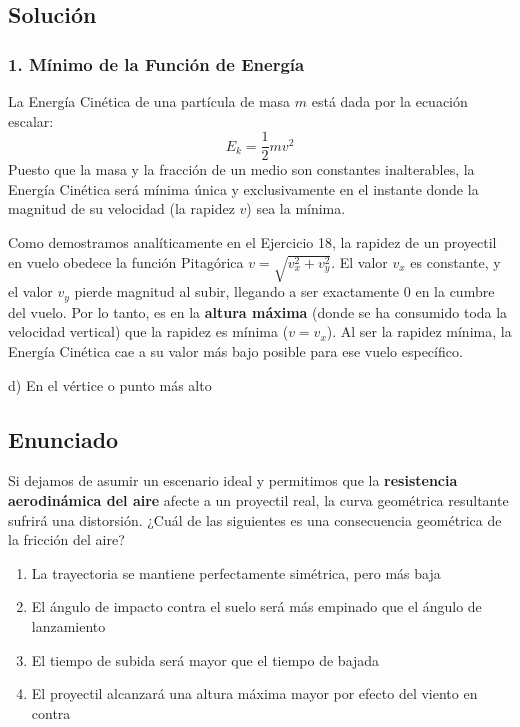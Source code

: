 \documentclass[12pt, a4paper]{article}
\begin{document}
\subsection*{Solución}

\subsubsection*{1. Mínimo de la Función de Energía}
La Energía Cinética de una partícula de masa $m$ está dada por la ecuación escalar:
$$ E_k = \frac{1}{2} m v^2 $$
Puesto que la masa y la fracción de un medio son constantes inalterables, la Energía Cinética será mínima única y exclusivamente en el instante donde la magnitud de su velocidad (la rapidez $v$) sea la mínima.

Como demostramos analíticamente en el Ejercicio 18, la rapidez de un proyectil en vuelo obedece la función Pitagórica $v = \sqrt{v_x^2 + v_y^2}$. 
El valor $v_x$ es constante, y el valor $v_y$ pierde magnitud al subir, llegando a ser exactamente $0$ en la cumbre del vuelo. 
Por lo tanto, es en la \textbf{altura máxima} (donde se ha consumido toda la velocidad vertical) que la rapidez es mínima ($v = v_x$). Al ser la rapidez mínima, la Energía Cinética cae a su valor más bajo posible para ese vuelo específico.

\begin{tcolorbox}[colback=green!5!white, colframe=green!50!black, title=Respuesta Final]
\centering \Large d) En el vértice o punto más alto
\end{tcolorbox}

\newpage

\subsection*{Enunciado}
Si dejamos de asumir un escenario ideal y permitimos que la \textbf{resistencia aerodinámica del aire} afecte a un proyectil real, la curva geométrica resultante sufrirá una distorsión. ¿Cuál de las siguientes es una consecuencia geométrica de la fricción del aire?
\begin{enumerate}[label=\alph*)]
    \item La trayectoria se mantiene perfectamente simétrica, pero más baja
    \item El ángulo de impacto contra el suelo será más empinado que el ángulo de lanzamiento
    \item El tiempo de subida será mayor que el tiempo de bajada
    \item El proyectil alcanzará una altura máxima mayor por efecto del viento en contra
\end{enumerate}
\end{document}
